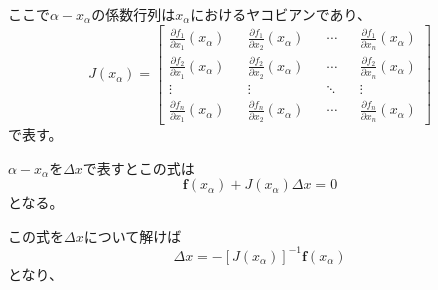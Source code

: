\documentclass[a4paper,11pt]{jsarticle}
\begin{document}
ここで$\alpha - x_\alpha$の係数行列は$x_\alpha$におけるヤコビアンであり、
\begin{equation*}
    J(x_\alpha) = 
    \begin{bmatrix}
        \frac{\partial f_1}{\partial x_1}(x_\alpha) && \frac{\partial f_1}{\partial x_2}(x_\alpha) && \cdots && \frac{\partial f_1}{\partial x_n}(x_\alpha) \\
        \frac{\partial f_2}{\partial x_1}(x_\alpha) && \frac{\partial f_2}{\partial x_2}(x_\alpha) && \cdots && \frac{\partial f_2}{\partial x_n}(x_\alpha) \\
        \vdots && \vdots && \ddots && \vdots \\
        \frac{\partial f_n}{\partial x_1}(x_\alpha) && \frac{\partial f_n}{\partial x_2}(x_\alpha) && \cdots && \frac{\partial f_n}{\partial x_n}(x_\alpha) 
    \end{bmatrix}
\end{equation*}
で表す。

$\alpha - x_\alpha$を$\Delta x$で表すとこの式は
\begin{equation*}
    \textbf{f}(x_\alpha) + J(x_\alpha) \Delta x = 0
\end{equation*}
となる。

この式を$\Delta x$について解けば
\begin{equation*}
    \Delta x = -[J(x_\alpha)]^{-1} \textbf{f}(x_\alpha)
\end{equation*}
となり、
\end{document}

